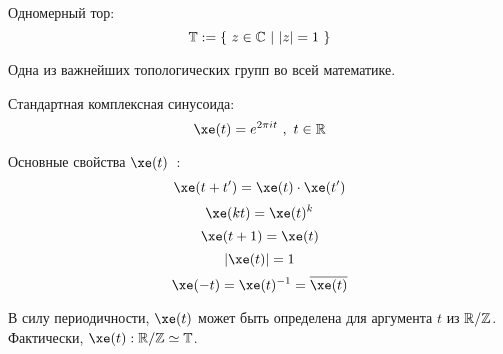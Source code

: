 \SSsect Одномерный тор: 
\[ \mathbb{T} := \left\lbrace~  z \in \mathbb{C}  ~|~  |z|=1  ~\right\rbrace \]

Одна из важнейших топологических групп во всей математике.

\SSsect Стандартная комплексная синусоида:
\[ \xe(t) = e^{2 \pi i t} ~,~ t \in \xR \]

\SSsect Основные свойства \( \xe(t) \)~:
\[
\xe(t+t') = \xe(t) \cdot \xe(t')
\]
\[
\xe(kt) = \xe(t)^k
\]
\[
\xe(t+1) = \xe(t)
\]
\[
|\xe(t)| = 1
\]
\[
\xe(-t) = \xe(t)^{-1} = \overline{\xe(t)}
\]

\SSsect В силу периодичности, \( \xe(t) \) может быть определена для аргумента \( t \) из \( \mathbb{R}/\mathbb{Z} \). 
Фактически, \( \xe(t) : \xR/\xZ \simeq \xT \).


